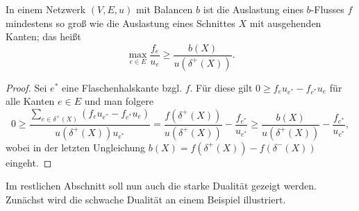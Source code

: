 \begin{theorem}\label{thm-weak-duality-min-con-flow}
 	In einem Netzwerk $(V, E, u)$ mit Balancen $b$ ist die Auslastung eines $b$-Flusses $f$ mindestens so groß wie die Auslastung eines Schnittes $X$ mit ausgehenden Kanten; das heißt \[\max_{e\in E} \frac{f_e}{u_e} \geq \frac{b(X)}{u(\delta^+(X))}.\]
\end{theorem}
\begin{proof}
	Sei $e^*$ eine Flaschenhalskante bzgl. $f$.
	Für diese gilt $0\geq f_e u_{e^*} - f_{e^*}u_e$ für alle Kanten $e\in E$ und man folgere
	\[
	0\geq \frac{\sum_{e\in \delta^+(X)}(f_e u_{e^*} - f_{e^*}u_e)}{u(\delta^+(X)) u_{e^*}} = \frac{f(\delta^+(X))}{u(\delta^+(X))} - \frac{f_{e^*}}{u_{e^*}} \geq \frac{b(X)}{u(\delta^+(X))} - \frac{f_{e^*}}{u_{e^*}},
	\]
	wobei in der letzten Ungleichung $b(X) = f(\delta^+(X)) - f(\delta^-(X))$ eingeht.
\end{proof}

Im restlichen Abschnitt soll nun auch die starke Dualität gezeigt werden.
Zunächst wird die schwache Dualität an einem Beispiel illustriert.

